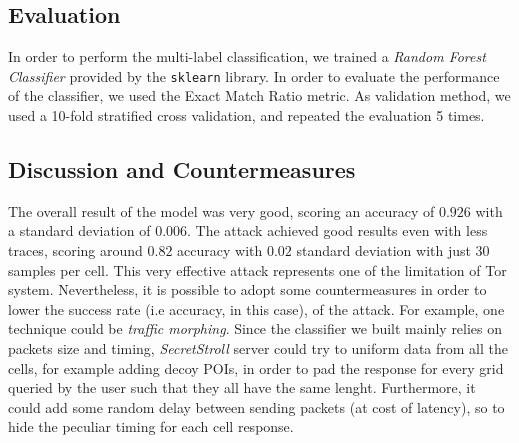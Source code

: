 \documentclass[10pt,conference,compsocconf]{IEEEtran}
\begin{document}
\subsection{Evaluation}
In order to perform the multi-label classification, we trained a \textit{Random Forest Classifier} provided by the \texttt{sklearn} library.
In order to evaluate the performance of the classifier, we used the Exact Match Ratio metric.
As validation method, we used a 10-fold stratified cross validation, and repeated the evaluation 5 times.

\subsection{Discussion and Countermeasures}
The overall result of the model was very good, scoring an accuracy of $0.926$ with a standard deviation of $0.006$.
The attack achieved good results even with less traces, scoring around $0.82$ accuracy with $0.02$ standard deviation with just 30 samples per cell.
This very effective attack represents one of the limitation of Tor system.
Nevertheless, it is possible to adopt some countermeasures in order to lower the success rate (i.e accuracy, in this case), of the attack.
For example, one technique could be \textit{traffic morphing}. Since the classifier we built mainly relies on packets size and timing,
\textit{SecretStroll} server could try to uniform data from all the cells, for example adding decoy POIs, in order to pad
the response for every grid queried by the user such that they all have the same lenght.
Furthermore, it could add some random delay between sending packets (at cost of latency), so to hide the peculiar timing for each cell response.



\printbibliography
\end{document}
